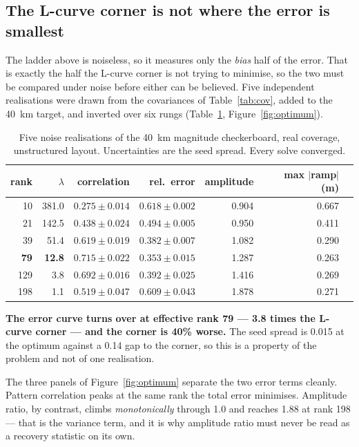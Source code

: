 \documentclass[11pt,a4paper]{article}
\begin{document}
\subsection{The L-curve corner is not where the error is smallest}
\label{sec:optimum}

The ladder above is noiseless, so it measures only the \emph{bias} half of the
error. That is exactly the half the L-curve corner is not trying to minimise, so
the two must be compared under noise before either can be believed. Five
independent realisations were drawn from the covariances of
Table~\ref{tab:cov}, added to the 40~km target, and inverted over six rungs
(Table~\ref{tab:optimum}, Figure~\ref{fig:optimum}).

\begin{table}[htbp]
\centering
\small
\begin{tabular}{rrrrrrr}
\toprule
rank & $\lambda$ & correlation & rel.\ error & amplitude & max $|$ramp$|$ (m) \\
\midrule
 10 & 381.0 & $0.275 \pm 0.014$ & $0.618 \pm 0.002$ & 0.904 & 0.667 \\
 21 & 142.5 & $0.438 \pm 0.024$ & $0.494 \pm 0.005$ & 0.950 & 0.411 \\
 39 &  51.4 & $0.619 \pm 0.019$ & $0.382 \pm 0.007$ & 1.082 & 0.290 \\
\textbf{79} & \textbf{12.8} & $\bm{0.715 \pm 0.022}$ & $\bm{0.353 \pm 0.015}$ & 1.287 & 0.263 \\
129 &   3.8 & $0.692 \pm 0.016$ & $0.392 \pm 0.025$ & 1.416 & 0.269 \\
198 &   1.1 & $0.519 \pm 0.047$ & $0.609 \pm 0.043$ & 1.878 & 0.271 \\
\bottomrule
\end{tabular}
\caption{Five noise realisations of the 40~km magnitude checkerboard, real
coverage, unstructured layout. Uncertainties are the seed spread. Every solve
converged.}
\label{tab:optimum}
\end{table}

\noindent
\textbf{The error curve turns over at effective rank 79 --- 3.8 times the
L-curve corner --- and the corner is 40\% worse.} The seed spread is 0.015 at the
optimum against a 0.14 gap to the corner, so this is a property of the problem
and not of one realisation.

The three panels of Figure~\ref{fig:optimum} separate the two error terms
cleanly. Pattern correlation peaks at the same rank the total error minimises.
Amplitude ratio, by contrast, climbs \emph{monotonically} through 1.0 and reaches
1.88 at rank 198 --- that is the variance term, and it is why amplitude ratio
must never be read as a recovery statistic on its own.
\end{document}

